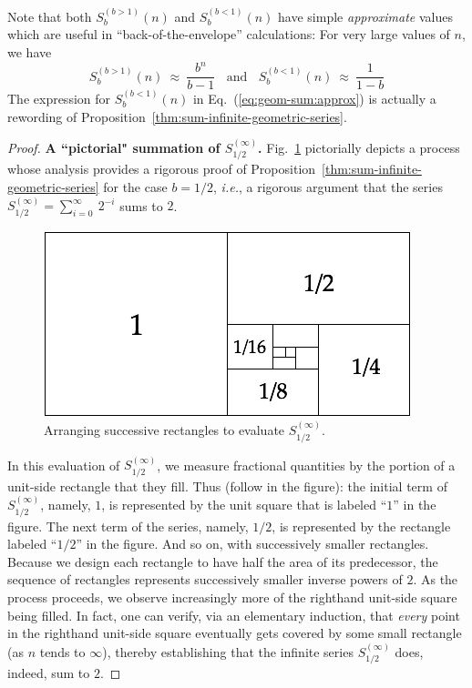 \medskip

Note that both $S^{(b>1)}_{b}(n)$ and $S^{(b<1)}_{b}(n)$ have simple {\em approximate} values which are useful in ``back-of-the-envelope'' calculations: For very large values of $n$, we have
\begin{equation}
\label{eq:geom-sum:approx}
S^{(b>1)}_{b}(n) \ \approx \ \frac{b^n}{b-1} \ \ \ \
\mbox{and} \ \ \ \
S^{(b<1)}_{b}(n) \ \approx \ \frac{1}{1-b} 
\end{equation}
The expression for $S^{(b<1)}_{b}(n)$ in Eq.~(\ref{eq:geom-sum:approx}) is actually a rewording of
Proposition~\ref{thm:sum-infinite-geometric-series}.

\medskip

\begin{proof}
{\bf A ``pictorial" summation of $S^{(\infty)}_{1/2}$.}
Fig.~\ref{fig:sumGeoBasis} pictorially depicts a process whose analysis provides a rigorous proof of Proposition~\ref{thm:sum-infinite-geometric-series} for the case $b = 1/2$, \textit{i.e.}, a rigorous argument that the series $S^{(\infty)}_{1/2} = \sum_{i=0}^\infty \ 2^{-i}$ sums to $2$.
\begin{figure}[htb]
\begin{center}
       \includegraphics[scale=0.35]{FiguresMaths/SumGeometric1sur2Bis}
 \caption{Arranging successive rectangles to evaluate $S^{(\infty)}_{1/2}$.}
       \label{fig:sumGeoBasis}
\end{center}
\end{figure}
In this evaluation of $S^{(\infty)}_{1/2}$, we measure fractional quantities by the portion of a unit-side rectangle that they fill.  Thus (follow in the figure): the initial term of $S^{(\infty)}_{1/2}$, namely, $1$, is represented by the unit square that is labeled ``$1$'' in the figure.  The next term of the series, namely, $1/2$, is represented by the rectangle labeled ``$1/2$'' in the figure.  And so on, with successively smaller rectangles.  Because we design each rectangle to have half the area of its predecessor, the sequence of rectangles represents successively smaller inverse powers of $2$.  As the process proceeds, we observe increasingly more of the righthand unit-side square being filled.  In fact, one can verify, via an elementary induction, that {\em every} point in the righthand unit-side square eventually gets covered by some small rectangle (as $n$ tends to $\infty$), thereby establishing that the infinite series $S^{(\infty)}_{1/2}$ does, indeed, sum to $2$.


\end{proof}
